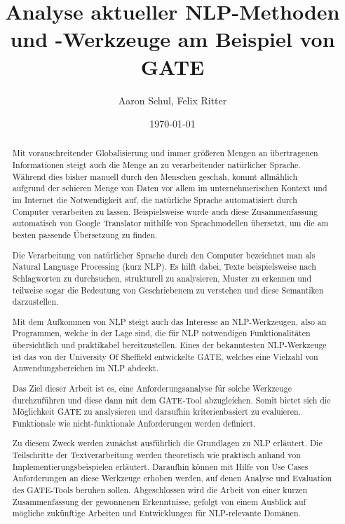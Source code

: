 \documentclass[12pt]{report}
\begin{document}
\title{Analyse aktueller NLP-Methoden und -Werkzeuge am Beispiel von GATE}
\author{Aaron Schul, Felix Ritter}
\date{\today}
\maketitle

\newpage
\begin{abstract}
Mit voranschreitender Globalisierung und immer größeren Mengen an übertragenen Informationen steigt auch die Menge an zu verarbeitender natürlicher Sprache. Während dies bisher manuell durch den Menschen geschah, kommt allmählich aufgrund der schieren Menge von Daten vor allem im unternehmerischen Kontext und im Internet die Notwendigkeit auf, die natürliche Sprache automatisiert durch Computer verarbeiten zu lassen. Beispielsweise wurde auch diese Zusammenfassung automatisch von Google Translator mithilfe von Sprachmodellen übersetzt, um die am besten passende Übersetzung zu finden.

Die Verarbeitung von natürlicher Sprache durch den Computer bezeichnet man als Natural Language Processing (kurz NLP). Es hilft dabei, Texte beispielsweise nach Schlagworten zu durchsuchen, strukturell zu analysieren, Muster zu erkennen und teilweise sogar die Bedeutung von Geschriebenem zu verstehen und diese Semantiken darzustellen.

Mit dem Aufkommen von NLP steigt auch das Interesse an NLP-Werkzeugen, also an Programmen, welche in der Lage sind, die für NLP notwendigen Funktionalitäten übersichtlich und praktikabel bereitzustellen. Eines der bekanntesten NLP-Werkzeuge ist das von der University Of Sheffield entwickelte GATE, welches eine Vielzahl von Anwendungsbereichen im NLP abdeckt.

Das Ziel dieser Arbeit ist es, eine Anforderungsanalyse für solche Werkzeuge durchzuführen und diese dann mit dem GATE-Tool abzugleichen. Somit bietet sich die Möglichkeit GATE zu analysieren und daraufhin kriterienbasiert zu evaluieren. Funktionale wie nicht-funktionale Anforderungen werden definiert.

Zu diesem Zweck werden zunächst ausführlich die Grundlagen zu NLP erläutert. Die Teilschritte der Textverarbeitung werden theoretisch wie praktisch anhand von Implementierungsbeispielen erläutert. Daraufhin können mit Hilfe von Use Cases Anforderungen an diese Werkzeuge erhoben werden, auf denen Analyse und Evaluation des GATE-Tools beruhen sollen. Abgeschlossen wird die Arbeit von einer kurzen Zusammenfassung der gewonnenen Erkenntnisse, gefolgt von einem Ausblick auf mögliche zukünftige Arbeiten und Entwicklungen für NLP-relevante Domänen.
\end{abstract}
\end{document}
